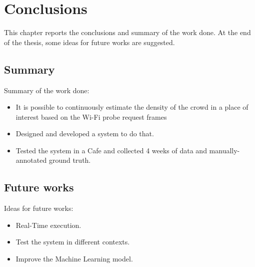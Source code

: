 \chapter{Conclusions}
\label{cha:conclusions}
\vspace{0.4 cm} 

This chapter reports the conclusions and summary of the work done. At the end of the thesis, some ideas for future works are suggested.


\section{Summary}
\label{sec:future}
\vspace{0.2 cm} 

Summary of the work done:
\begin{itemize}
  \item It is possible to continuously estimate the density of the crowd in a place of interest based on the Wi-Fi probe request frames
  \item Designed and developed a system to do that.
  \item Tested the system in a Cafe and collected 4 weeks of data and manually-annotated ground truth.
\end{itemize}


\section{Future works}
\label{sec:future}
\vspace{0.2 cm} 

Ideas for future works:
\begin{itemize}
  \item Real-Time execution.
  \item Test the system in different contexts.
  \item Improve the Machine Learning model.
\end{itemize}
